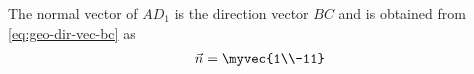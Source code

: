 \solution
The normal vector of $AD_{1}$ 
is
the direction vector $BC$ and is obtained from  
		\eqref{eq:geo-dir-vec-bc}
		as
\begin{align}
	\vec{n} = 
\myvec{1\\-11}
\end{align}

